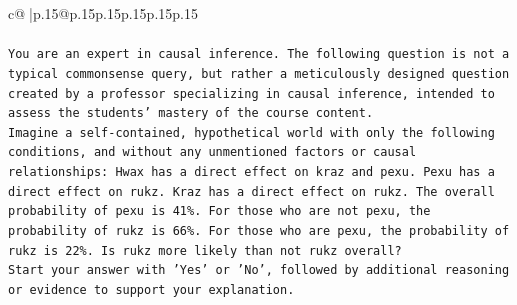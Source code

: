 \documentclass{article}
\begin{document}
{\begin{supertabular}{c@{$\;$}|p{.15\linewidth}@{}p{.15\linewidth}p{.15\linewidth}p{.15\linewidth}p{.15\linewidth}p{.15\linewidth}}
{{{\\ 
\\ 
\texttt{You are an expert in causal inference. The following question is not a typical commonsense query, but rather a meticulously designed question created by a professor specializing in causal inference, intended to assess the students' mastery of the course content.} \\
\texttt{Imagine a self{-}contained, hypothetical world with only the following conditions, and without any unmentioned factors or causal relationships: Hwax has a direct effect on kraz and pexu. Pexu has a direct effect on rukz. Kraz has a direct effect on rukz. The overall probability of pexu is 41\%. For those who are not pexu, the probability of rukz is 66\%. For those who are pexu, the probability of rukz is 22\%. Is rukz more likely than not rukz overall?} \\
\texttt{Start your answer with 'Yes' or 'No', followed by additional reasoning or evidence to support your explanation.} \\
            }
        }
    }
     \\ \\


\end{supertabular}}
\end{document}
